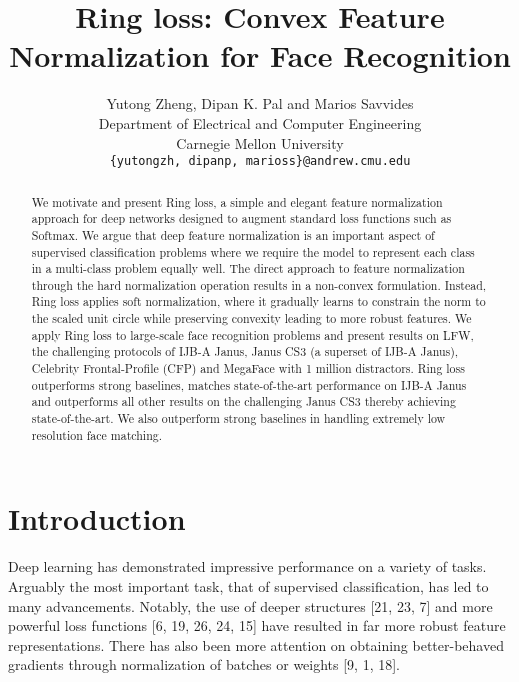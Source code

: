 \documentclass[10pt,twocolumn,letterpaper]{article}
\begin{document}
\title{Ring loss: Convex Feature Normalization for Face Recognition}

\author{Yutong Zheng, Dipan K. Pal and Marios Savvides\\
Department of Electrical and Computer Engineering\\
Carnegie Mellon University\\
{\tt\small \{yutongzh, dipanp, marioss\}@andrew.cmu.edu}
}


\maketitle

\begin{abstract}
We motivate and present Ring loss, a simple and elegant
feature normalization approach for deep networks designed
to augment standard loss functions such as Softmax. We
argue that deep feature normalization is an important aspect of supervised classification problems where we require
the model to represent each class in a multi-class problem
equally well. The direct approach to feature normalization through the hard normalization operation results in a
non-convex formulation. Instead, Ring loss applies soft normalization, where it gradually learns to constrain the norm
to the scaled unit circle while preserving convexity leading
to more robust features. We apply Ring loss to large-scale
face recognition problems and present results on LFW, the
challenging protocols of IJB-A Janus, Janus CS3 (a superset of IJB-A Janus), Celebrity Frontal-Profile (CFP) and
MegaFace with 1 million distractors. Ring loss outperforms
strong baselines, matches state-of-the-art performance on
IJB-A Janus and outperforms all other results on the challenging Janus CS3 thereby achieving state-of-the-art. We
also outperform strong baselines in handling extremely low
resolution face matching.
\end{abstract}

\section{Introduction}

Deep learning has demonstrated impressive performance
on a variety of tasks. Arguably the most important task, that
of supervised classification, has led to many advancements.
Notably, the use of deeper structures [21, 23, 7] and more
powerful loss functions [6, 19, 26, 24, 15] have resulted
in far more robust feature representations. There has also
been more attention on obtaining better-behaved gradients
through normalization of batches or weights [9, 1, 18].
\end{document}
